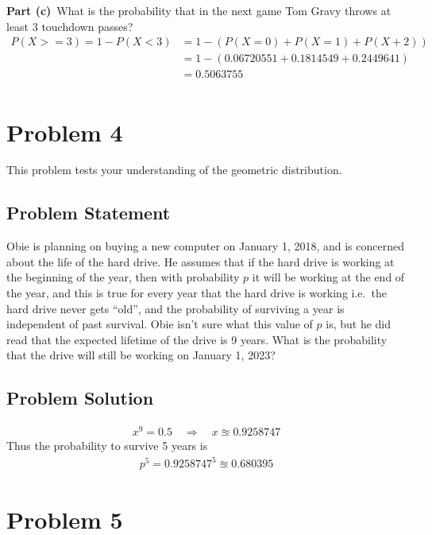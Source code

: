 \documentclass[12pt]{article}
\theoremstyle{definition}
\begin{document}
\vspace{4.5in}
\noindent
{\bf Part (c)}\ What is the probability that in the next game Tom Gravy throws at least 3 touchdown passes?
\begin{align*}
P(X >= 3) = 1 - P(X < 3) &= 1 - (P(X = 0) + P(X = 1) + P(X + 2))\\
&= 1 - (0.06720551 + 0.1814549 + 0.2449641)\\
& = 0.5063755\\
\end{align*}

\newpage
\section*{Problem 4}

This problem tests your understanding of the geometric distribution.

\subsection*{Problem Statement}

Obie is planning on buying a new computer on January 1, 2018, and is concerned about the life of the hard drive. He assumes that if the hard drive is working at the beginning of the year, then with probability $p$ it will be working at the end of the year, and this is true for every year that the hard drive is working i.e.\ the hard drive never gets ``old'', and the probability of surviving a year is independent of past survival. Obie isn't sure what this value of $p$ is, but he did read that the expected lifetime of the drive is 9 years. What is the probability that the drive will still be working on January 1, 2023?


\subsection*{Problem Solution}
\begin{align*}
x^9 = 0.5 \quad\Rightarrow\quad x \approxeq 0.9258747
\end{align*}
Thus the probability to survive 5 years is
\begin{align*}
p^5 = 0.9258747^5 \approxeq 0.680395
\end{align*}

\newpage
\section*{Problem 5}
\end{document}

